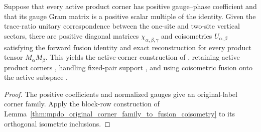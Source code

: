 \begin{lemma}
    \label{thm:mpdo_normalized_product_corners_to_fusion_coisometry}
    \leanok
    Suppose that every active product corner has positive gauge--phase
    coefficient and that its gauge Gram matrix is a positive scalar multiple
    of the identity. Given the trace-ratio unitary correspondence between the
    one-site and two-site vertical sectors, there are positive diagonal
    matrices $\chi_{\alpha,\beta,\gamma}$ and coisometries
    $U_{\alpha,\beta}$ satisfying the forward fusion identity and exact
    reconstruction for every product tensor $M_\alpha M_\beta$. This yields the
    active-corner construction of
    \cite[Appendix~C.4, lines~2020--2029]{Cirac2016MPDO_arXiv}, retaining
    active product corners \cite{gap:cpsv16_bnt_uniqueness_zero_coefficient},
    handling fixed-pair support \cite{gap:cpsv16_figure11_per_pair_support},
    and using coisometric fusion onto the active subspace
    \cite{gap:cpsv16_figure11_fusion_coisometry}.
\end{lemma}

\begin{proof}\leanok
    The positive coefficients and normalized gauges give an original-label
    corner family. Apply the block-row construction of
    Lemma~\ref{thm:mpdo_original_corner_family_to_fusion_coisometry} to its
    orthogonal isometric inclusions.
\end{proof}

